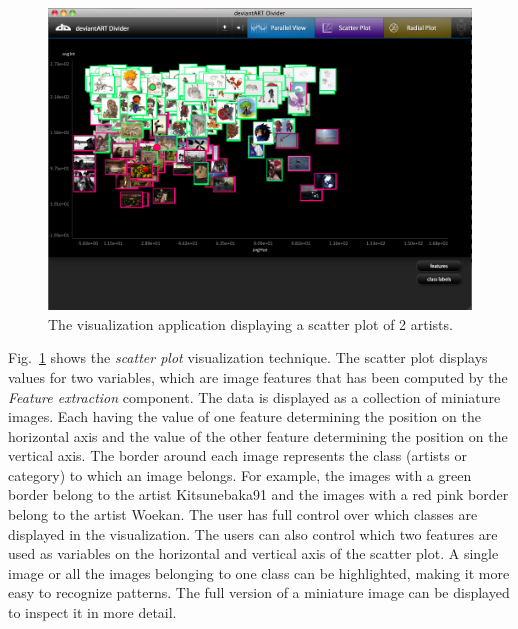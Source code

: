 \begin{figure}[htb]
  \centering
  \includegraphics[width=1\linewidth]{img/visualization_scatter.png}
  \caption{The visualization application displaying a scatter plot of 2 artists.}
  \label{fig:visualization_scatter}
\end{figure}

Fig.~\ref{fig:visualization_scatter} shows the \textit{scatter plot} visualization technique.
The scatter plot displays values for two variables, which are image features that has been computed by the \textit{Feature extraction} component.
The data is displayed as a collection of miniature images.
Each having the value of one feature determining the position on the horizontal axis and the value of the other feature determining the position on the vertical axis.
The border around each image represents the class (artists or category) to which an image belongs.
For example, the images with a green border belong to the artist Kitsunebaka91 and the images with a red pink border belong to the artist Woekan.
The user has full control over which classes are displayed in the visualization.
The users can also control which two features are used as variables on the horizontal and vertical axis of the scatter plot.
A single image or all the images belonging to one class can be highlighted, making it more easy to recognize patterns.
The full version of a miniature image can be displayed to inspect it in more detail.

